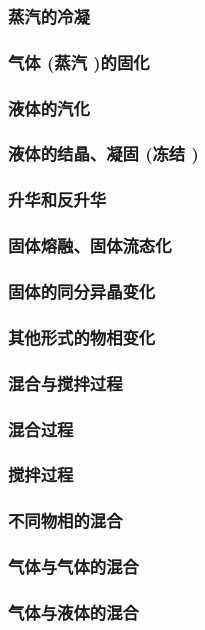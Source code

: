 \documentclass[UTF8]{../../ApplicationUniverse}
\begin{document}
    \subsubsection{蒸汽的冷凝}
    \subsubsection{气体 (蒸汽 )的固化}
    \subsubsection{液体的汽化}
    \subsubsection{液体的结晶、凝固 (冻结 )}
    \subsubsection{升华和反升华}
    \subsubsection{固体熔融、固体流态化}
    \subsubsection{固体的同分异晶变化}
    \subsubsection{其他形式的物相变化}
\subsubsection{混合与搅拌过程}
    \subsubsection{混合过程}
    \subsubsection{搅拌过程}
    \subsubsection{不同物相的混合}
        \subsubsection{气体与气体的混合}
        \subsubsection{气体与液体的混合}
\end{document}
